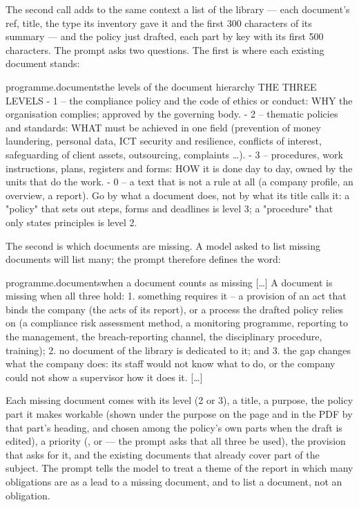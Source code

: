 The second call adds to the same context a list of the library --- each document's ref, title,
the type its inventory gave it and the first 300 characters of its summary --- and the policy
just drafted, each part by key with its first 500 characters. The prompt
 asks two questions. The first is where each existing document
stands:

\begin{promptexcerpt}{programme.documents}{the levels of the document hierarchy}
THE THREE LEVELS
- 1 – the compliance policy and the code of ethics or conduct: WHY the organisation complies; approved by the governing body.
- 2 – thematic policies and standards: WHAT must be achieved in one field (prevention of money laundering, personal data, ICT security and resilience, conflicts of interest, safeguarding of client assets, outsourcing, complaints …).
- 3 – procedures, work instructions, plans, registers and forms: HOW it is done day to day, owned by the units that do the work.
- 0 – a text that is not a rule at all (a company profile, an overview, a report).
Go by what a document does, not by what its title calls it: a "policy" that sets out steps, forms and deadlines is level 3; a "procedure" that only states principles is level 2.
\end{promptexcerpt}

The second is which documents are missing. A model asked to list missing documents will list
many; the prompt therefore defines the word:

\begin{promptexcerpt}{programme.documents}{when a document counts as missing}
[…]
A document is missing when all three hold:
1. something requires it – a provision of an act that binds the company (the acts of its report), or a process the drafted policy relies on (a compliance risk assessment method, a monitoring programme, reporting to the management, the breach-reporting channel, the disciplinary procedure, training);
2. no document of the library is dedicated to it; and
3. the gap changes what the company does: its staff would not know what to do, or the company could not show a supervisor how it does it.
[…]
\end{promptexcerpt}

Each missing document comes with its level (2 or 3), a title, a purpose, the policy part it
makes workable (shown under the purpose on the page and in the PDF by that part's heading,
and chosen among the policy's own parts when the draft is edited), a priority (,  or  --- the prompt asks that
all three be used), the provision that asks for it, and the existing documents that already
cover part of the subject. The prompt tells the model to treat a theme of the report in which
many obligations are  as a lead to a missing document, and to list a
document, not an obligation.

